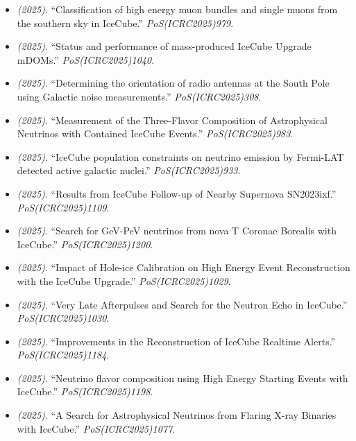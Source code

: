 \begin{itemize}
\item \textit{(2025)}. ``Classification of high energy muon bundles and single muons from the southern sky in IceCube.'' \textit{PoS(ICRC2025)979}.  
\item \textit{(2025)}. ``Status and performance of mass-produced IceCube Upgrade mDOMs.'' \textit{PoS(ICRC2025)1040}.  
\item \textit{(2025)}. ``Determining the orientation of radio antennas at the South Pole using Galactic noise measurements.'' \textit{PoS(ICRC2025)308}.  
\item \textit{(2025)}. ``Measurement of the Three-Flavor Composition of Astrophysical Neutrinos with Contained IceCube Events.'' \textit{PoS(ICRC2025)983}.  
\item \textit{(2025)}. ``IceCube population constraints on neutrino emission by Fermi-LAT detected active galactic nuclei.'' \textit{PoS(ICRC2025)933}.  
\item \textit{(2025)}. ``Results from IceCube Follow-up of Nearby Supernova SN2023ixf.'' \textit{PoS(ICRC2025)1109}.  
\item \textit{(2025)}. ``Search for GeV-PeV neutrinos from nova T Coronae Borealis with IceCube.'' \textit{PoS(ICRC2025)1200}.  
\item \textit{(2025)}. ``Impact of Hole-ice Calibration on High Energy Event Reconstruction with the IceCube Upgrade.'' \textit{PoS(ICRC2025)1029}.  
\item \textit{(2025)}. ``Very Late Afterpulses and Search for the Neutron Echo in IceCube.'' \textit{PoS(ICRC2025)1030}.  
\item \textit{(2025)}. ``Improvements in the Reconstruction of IceCube Realtime Alerts.'' \textit{PoS(ICRC2025)1184}.  
\item \textit{(2025)}. ``Neutrino flavor composition using High Energy Starting Events with IceCube.'' \textit{PoS(ICRC2025)1198}.  
\item \textit{(2025)}. ``A Search for Astrophysical Neutrinos from Flaring X-ray Binaries with IceCube.'' \textit{PoS(ICRC2025)1077}.  

\end{itemize}
